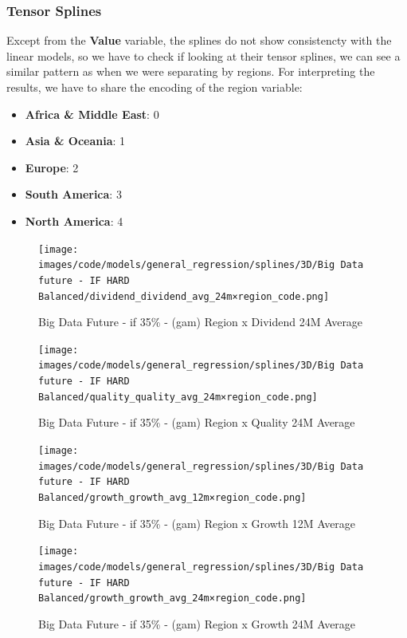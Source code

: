 \documentclass[11pt,english,a4paper,hidelinks]{book}
\begin{document}
\subsubsection{Tensor Splines}

Except from the \textbf{Value} variable, the splines do not show consistencty with the linear models, so we have to check if looking at their tensor splines, we can see a similar pattern as when we were separating by regions. For interpreting the results, we have to share the encoding of the region variable:
\begin{itemize}
    \item \textbf{Africa \& Middle East}: 0
    \item \textbf{Asia \& Oceania}: 1
    \item \textbf{Europe}: 2
    \item \textbf{South America}: 3
    \item \textbf{North America}: 4
\end{itemize}



\begin{figure}[H]
    \centering
    \begin{minipage}{0.48\textwidth}
        \centering
        \texttt{[image: images/code/models/general\_regression/splines/3D/Big Data future - IF HARD Balanced/dividend\_dividend\_avg\_24m×region\_code.png]}
        \caption{Big Data Future - \acrshort{if} 35\% - (\acrshort{gam}) Region x Dividend 24M Average}
        \label{fig:tensor_dividend_dividend_avg_24m}
    \end{minipage}\hfill
    \begin{minipage}{0.48\textwidth}
        \centering
        \texttt{[image: images/code/models/general\_regression/splines/3D/Big Data future - IF HARD Balanced/quality\_quality\_avg\_24m×region\_code.png]}
        \caption{Big Data Future - \acrshort{if} 35\% - (\acrshort{gam}) Region x Quality 24M Average}
        \label{fig:tensor_quality_quality_avg_24m}
    \end{minipage}
\end{figure}

\begin{figure}[H]
    \centering
    \begin{minipage}{0.48\textwidth}
        \centering
        \texttt{[image: images/code/models/general\_regression/splines/3D/Big Data future - IF HARD Balanced/growth\_growth\_avg\_12m×region\_code.png]}
        \caption{Big Data Future - \acrshort{if} 35\% - (\acrshort{gam}) Region x Growth 12M Average}
        \label{fig:tensor_growth_growth_avg_12m}
    \end{minipage}\hfill
    \begin{minipage}{0.48\textwidth}
        \centering
        \texttt{[image: images/code/models/general\_regression/splines/3D/Big Data future - IF HARD Balanced/growth\_growth\_avg\_24m×region\_code.png]}
        \caption{Big Data Future - \acrshort{if} 35\% - (\acrshort{gam}) Region x Growth 24M Average}
        \label{fig:tensor_growth_growth_avg_24m}
    \end{minipage}
\end{figure}
\end{document}
